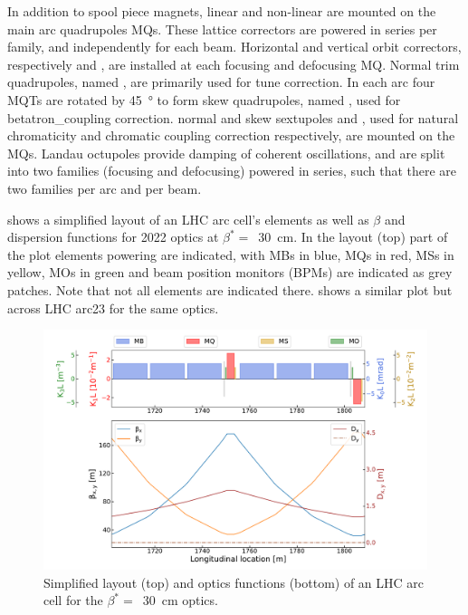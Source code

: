 In addition to spool piece magnets, linear and non-linear  are mounted on the main arc quadrupoles MQs.
These lattice correctors are powered in series per family, and independently for each beam.
Horizontal and vertical orbit correctors, respectively  and , are installed at each focusing and defocusing MQ.
Normal \gls{trim} quadrupoles, named , are primarily used for tune correction.
In each arc four MQTs are rotated by \qty{45}{\degree} to form \gls{skew} quadrupoles, named , used for \gls{betatron_coupling} correction.
\Gls{normal} and \gls{skew} sextupoles  and , used for natural chromaticity and chromatic coupling correction respectively, are mounted on the MQs.
Landau octupoles  provide damping of coherent oscillations, and are split into two families (focusing and defocusing) powered in series, such that there are two families per arc and per beam.
\break

 shows a simplified layout of an LHC arc cell's elements as well as \(\beta\) and dispersion functions for \num{2022} optics at \(\beta^{\ast} =\)~\qty{30}{\centi\meter}.
In the layout (top) part of the plot elements powering are indicated, with MBs in \textcolor{mplblue}{blue}, MQs in \textcolor{latwiss_red}{red}, MSs in \textcolor{latwiss_yellow}{yellow}, MOs in \textcolor{latwiss_green}{green} and beam position monitors (BPMs) are indicated as grey patches.
Note that not all elements are indicated there.
 shows a similar plot but across LHC arc\num{23} for the same optics.

\begin{figure}[!hbt]
  \centering
  \includegraphics*[width=\linewidth]{Figures/Optics_Measurements_Corrections_at_LHC/lhc_arc_cell.pdf}
  \caption{Simplified layout (top) and optics functions (bottom) of an LHC arc cell for the \(\beta^{\ast} =\)~\qty{30}{\centi\meter} optics.}
  \label{figure:lhc_arc_cell_latwiss}
\end{figure}

